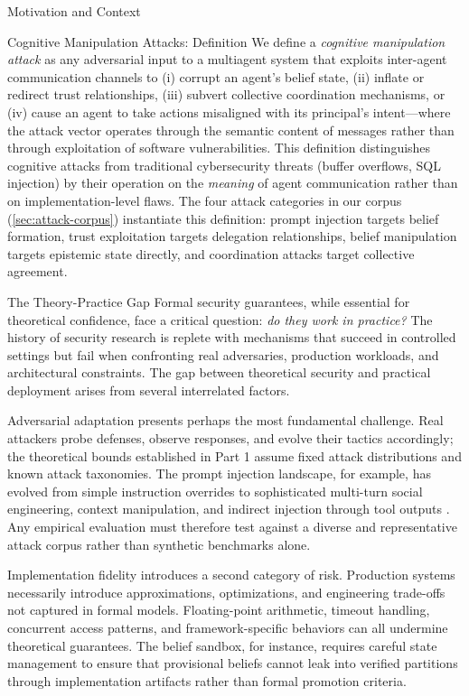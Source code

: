 \documentclass[
  ignorenonframetext,
]{beamer}
\begin{document}
\begin{frame}{Motivation and Context}
\begin{block}{Cognitive Manipulation Attacks: Definition}
\protect{}\label{cognitive-manipulation-attacks-definition}
We define a \emph{cognitive manipulation attack} as any adversarial
input to a multiagent system that exploits inter-agent communication
channels to (i) corrupt an agent's belief state, (ii) inflate or
redirect trust relationships, (iii) subvert collective coordination
mechanisms, or (iv) cause an agent to take actions misaligned with its
principal's intent---where the attack vector operates through the
semantic content of messages rather than through exploitation of
software vulnerabilities. This definition distinguishes cognitive
attacks from traditional cybersecurity threats (buffer overflows, SQL
injection) by their operation on the \emph{meaning} of agent
communication rather than on implementation-level flaws. The four attack
categories in our corpus (\cref{sec:attack-corpus}) instantiate this
definition: prompt injection targets belief formation, trust
exploitation targets delegation relationships, belief manipulation
targets epistemic state directly, and coordination attacks target
collective agreement.
\end{block}

\begin{block}{The Theory-Practice Gap}
\protect{}\label{the-theory-practice-gap}
Formal security guarantees, while essential for theoretical confidence,
face a critical question: \emph{do they work in practice?} The history
of security research is replete with mechanisms that succeed in
controlled settings but fail when confronting real adversaries,
production workloads, and architectural constraints. The gap between
theoretical security and practical deployment arises from several
interrelated factors.

Adversarial adaptation presents perhaps the most fundamental challenge.
Real attackers probe defenses, observe responses, and evolve their
tactics accordingly; the theoretical bounds established in Part 1 assume
fixed attack distributions and known attack taxonomies. The prompt
injection landscape, for example, has evolved from simple instruction
overrides to sophisticated multi-turn social engineering, context
manipulation, and indirect injection through tool outputs
\cite{greshake2023indirect}. Any empirical evaluation must therefore
test against a diverse and representative attack corpus rather than
synthetic benchmarks alone.

Implementation fidelity introduces a second category of risk. Production
systems necessarily introduce approximations, optimizations, and
engineering trade-offs not captured in formal models. Floating-point
arithmetic, timeout handling, concurrent access patterns, and
framework-specific behaviors can all undermine theoretical guarantees.
The belief sandbox, for instance, requires careful state management to
ensure that provisional beliefs cannot leak into verified partitions
through implementation artifacts rather than formal promotion criteria.


\end{block}
\end{frame}
\end{document}
